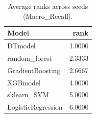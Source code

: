 \begin{table}[t]
\centering
\begin{tabular}{lr}
\toprule
Model & rank \\
\midrule
DTmodel & 1.0000 \\
random_forest & 2.3333 \\
GradientBoosting & 2.6667 \\
XGBmodel & 4.0000 \\
sklearn_SVM & 5.0000 \\
LogisticRegression & 6.0000 \\
\bottomrule
\end{tabular}
\caption{Average ranks across seeds (Macro_Recall).}
\label{tab:avg_rank_Macro_Recall}
\end{table}